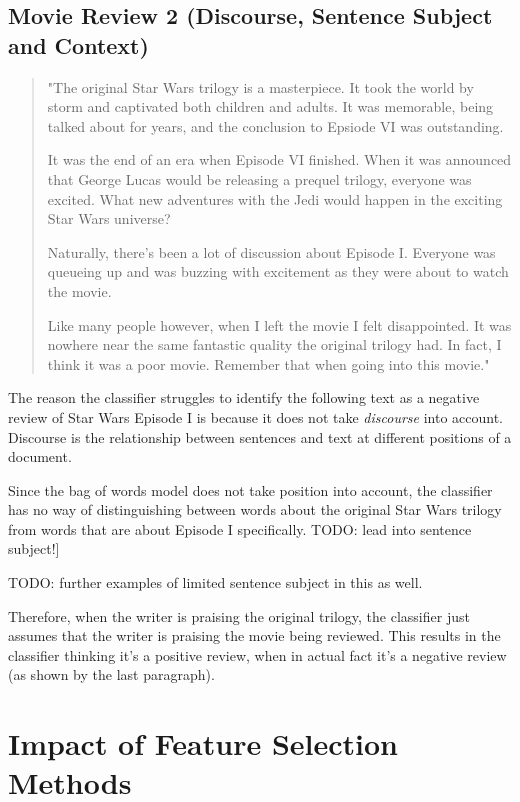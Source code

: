 \documentclass{article}
\begin{document}
\subsection{Movie Review 2 (Discourse, Sentence Subject and Context)}

\begin{quote}
"The original Star Wars trilogy is a masterpiece. It took the world by storm and captivated both children and adults. It was memorable, being talked about for years, and the conclusion to Epsiode VI was outstanding.

It was the end of an era when Episode VI finished. When it was announced that George Lucas would be releasing a prequel trilogy, everyone was excited. What new adventures with the Jedi would happen in the exciting Star Wars universe?

Naturally, there's been a lot of discussion about Episode I. Everyone was queueing up and was buzzing with excitement as they were about to watch the movie.

Like many people however, when I left the movie I felt disappointed. It was nowhere near the same fantastic quality the original trilogy had. In fact, I think it was a poor movie. Remember that when going into this movie."
\end{quote}

The reason the classifier struggles to identify the following text as a negative review of Star Wars Episode I is because it does not take \textit{discourse} into account. Discourse is the relationship between sentences and text at different positions of a document.

Since the bag of words model does not take position into account, the classifier has no way of distinguishing between words about the original Star Wars trilogy from words that are about Episode I specifically. TODO: lead into sentence subject!]

TODO: further examples of limited sentence subject in this as well.

Therefore, when the writer is praising the original trilogy, the classifier just assumes that the writer is praising the movie being reviewed. This results in the classifier thinking it's a positive review, when in actual fact it's a negative review (as shown by the last paragraph).

\section{Impact of Feature Selection Methods}
\end{document}
